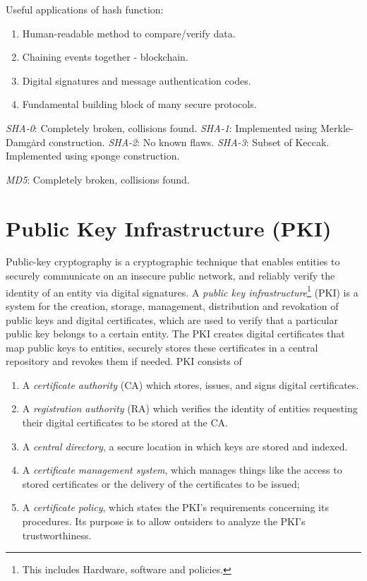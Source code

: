\documentclass[a4paper, 12pt]{book} %
\begin{document}
Useful applications of hash function:
\begin{enumerate}
    \item Human-readable method to compare/verify data.
    \item Chaining events together - blockchain.
    \item Digital signatures and message authentication codes.
    \item Fundamental building block of many secure protocols.
\end{enumerate}

\begin{example}
    \emph{SHA-0}: Completely broken, collisions found.
    \emph{SHA-1}: Implemented using Merkle-Damg\.ard construction. 
    \emph{SHA-2}: No known flaws.
    \emph{SHA-3}: Subset of Keccak. Implemented using sponge construction.
\end{example}

\begin{example}
    \emph{MD5}: Completely broken, collisions found.
\end{example}




\chapter{Public Key Infrastructure (PKI)}

Public-key cryptography is a cryptographic technique that enables entities to securely communicate on an insecure public network, and reliably verify the identity of an entity via digital signatures. A \emph{public key infrastructure}\footnote{This includes Hardware, software and policies.} (PKI) is a system for the creation, storage, management, distribution and revokation of public keys and digital certificates, which are used to verify that a particular public key belongs to a certain entity. The PKI creates digital certificates that map public keys to entities, securely stores these certificates in a central repository and revokes them if needed. PKI consists of
\begin{enumerate}
    \item A \emph{certificate authority} (CA) which stores, issues, and signs digital certificates.
    \item A \emph{registration authority} (RA) which verifies the identity of entities requesting their digital certificates to be stored at the CA.
    \item A \emph{central directory}, a secure location in which keys are stored and indexed.
    \item A \emph{certificate management system}, which manages things like the access to stored certificates or the delivery of the certificates to be issued;
    \item A \emph{certificate policy}, which states the PKI's requirements concerning its procedures. Its purpose is to allow outsiders to analyze the PKI's trustworthiness.
\end{enumerate}
\end{document}
